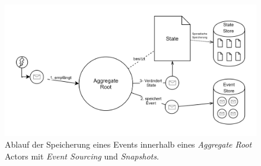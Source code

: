 \begin{figure}
    \centering
    \includegraphics[width=\linewidth]{gfx/implementation/EventSourcingAkka}
    \caption{Ablauf der Speicherung eines Events innerhalb eines \textit{Aggregate Root} Actors mit \textit{Event Sourcing} und \textit{Snapshots}.}
    \label{fig:implementation:eventSourcingAggregateRoot}
\end{figure} 

